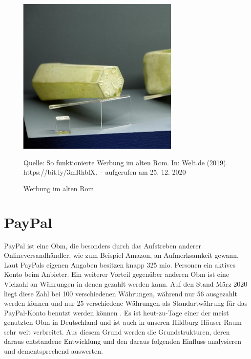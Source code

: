 \documentclass[a4paper, 12pt]{scrartcl}
\newcommand*{\bildquelle}{%
  \footnotesize Quelle:
}
\begin{document}
\begin{figure}[h]
    \begin{center}
        \includegraphics[width=8cm]{media/5.png}
        \caption{Werbung im alten Rom}
        \label{werbung-rom}
        \bildquelle So funktionierte Werbung im alten Rom. In: Welt.de (2019). https://bit.ly/3mRhblX. – aufgerufen am 25. 12. 2020

    \end{center}
\end{figure}




        \newpage
        
        
        
    \section{PayPal}
    
    
    PayPal ist eine \ac{Obm}, die besonders durch das Aufstreben anderer Onlineversandhändler, wie zum Beispiel Amazon, an Aufmerksamkeit gewann. Laut PayPals eigenen Angaben besitzen knapp 325 mio. Personen ein aktives Konto beim Anbieter. Ein weiterer Vorteil gegenüber anderen Obm ist eine Vielzahl an Währungen in denen gezahlt werden kann. Auf den Stand März 2020 liegt diese Zahl bei 100 verschiedenen Währungen, während nur 56 ausgezahlt werden können und nur 25 verschiedene Währungen als Standartwährung für das PayPal-Konto benutzt werden können \cite{PayPala}. Es ist heut-zu-Tage einer der meist genutzten \cite{poleshova} Obm in Deutschland und ist auch in unseren Hildburg Häuser Raum sehr weit verbreitet. Aus diesem Grund werden die Grundstrukturen, deren daraus entstandene Entwicklung und den daraus folgenden Einfluss analysieren und dementsprechend auswerten.
\end{document}
